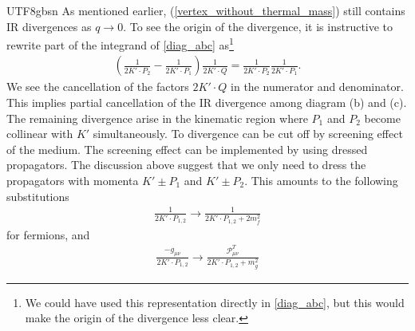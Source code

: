 \documentclass[11pt]{article}\def\baselinestretch{1.4}
\def\({\left(}
\def\){\right)}
\begin{document}
\begin{CJK}{UTF8}{gbsn}
As mentioned earlier, (\ref{vertex_without_thermal_mass}) still contains IR divergences as $q\to0$. To see the origin of the divergence, it is instructive to rewrite part of the integrand of \eqref{diag_abc} as\footnote{We could have used this representation directly in \eqref{diag_abc}, but this would make the origin of the divergence less clear.}
\begin{align}
\(\frac{1}{2K'\cdot P_2}-\frac{1}{2K'\cdot P_1}\)\frac{1}{2K'\cdot Q}=\frac{1}{2K'\cdot P_2}\frac{1}{2K'\cdot P_1}.
\end{align}
We see the cancellation of the factors $2K'\cdot Q$ in the numerator and denominator. This implies partial cancellation of the IR divergence among diagram (b) and (c). The remaining divergence arise in the kinematic region where $P_1$ and $P_2$ become collinear with $K'$ simultaneously. To divergence can be cut off by screening effect of the medium. The screening effect can be implemented by using dressed propagators. The discussion above suggest that we only need to dress the propagators with momenta $K'\pm P_1$ and $K'\pm P_2$. This amounts to the following substitutions \cite{le2000thermal}
\begin{align}
\frac{1}{2K'\cdot P_{1,2}} \to \frac{1}{2K'\cdot P_{1,2}+2m_f^2} \label{substitute_1}
\end{align}
for fermions, and
\begin{align}
\frac{-g_{\mu \nu }}{2K'\cdot P_{1,2}} \to \frac{\mathcal{P}^T_{\mu \nu }}{2K'\cdot P_{1,2}+m_g^2} \label{substitute_2}

\end{align}
\end{CJK}
\end{document}
